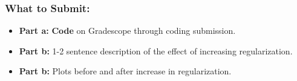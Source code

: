 \documentclass{article}
\begin{document}
\begin{aprob}
\begin{enumerate}
    
    \end{enumerate}
    
    \subsubsection*{What to Submit:}
    \begin{itemize}
        \item \textbf{Part a:} \textbf{Code} on Gradescope through coding submission.
        \item \textbf{Part b:} 1-2 sentence description of the effect of increasing regularization.
        \item \textbf{Part b:} Plots before and after increase in regularization.
        
    \end{itemize}
\end{aprob}
\end{document}
